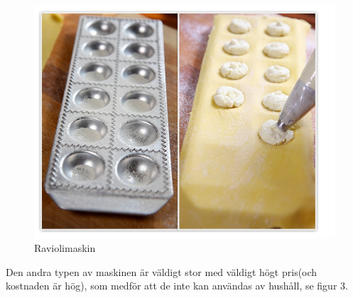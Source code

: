 	 		 		\begin{figure}[h]
	 		 			\begin{center}
	 		 				\includegraphics[scale=0.5]{images/raviolimoldwithfilling.jpg}
	 		 				\caption{Raviolimaskin}
	 		 				\label{ravioli}	
	 		 			\end{center}
	 		 		\end{figure}
Den andra typen av maskinen är väldigt stor med väldigt högt pris(och kostnaden är hög), som medför att de inte kan användas av hushåll, se figur 3.
